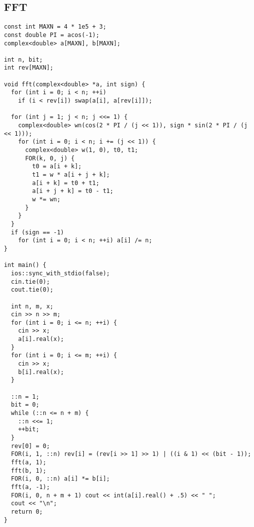 \documentclass[twoside]{article}
\begin{document}
\subsection{FFT}
\begin{lstlisting}
const int MAXN = 4 * 1e5 + 3;
const double PI = acos(-1);
complex<double> a[MAXN], b[MAXN];

int n, bit;
int rev[MAXN];

void fft(complex<double> *a, int sign) {
  for (int i = 0; i < n; ++i)
    if (i < rev[i]) swap(a[i], a[rev[i]]);

  for (int j = 1; j < n; j <<= 1) {
    complex<double> wn(cos(2 * PI / (j << 1)), sign * sin(2 * PI / (j << 1)));
    for (int i = 0; i < n; i += (j << 1)) {
      complex<double> w(1, 0), t0, t1;
      FOR(k, 0, j) {
        t0 = a[i + k];
        t1 = w * a[i + j + k];
        a[i + k] = t0 + t1;
        a[i + j + k] = t0 - t1;
        w *= wn;
      }
    }
  }
  if (sign == -1)
    for (int i = 0; i < n; ++i) a[i] /= n;
}

int main() {
  ios::sync_with_stdio(false);
  cin.tie(0);
  cout.tie(0);

  int n, m, x;
  cin >> n >> m;
  for (int i = 0; i <= n; ++i) {
    cin >> x;
    a[i].real(x);
  }
  for (int i = 0; i <= m; ++i) {
    cin >> x;
    b[i].real(x);
  }

  ::n = 1;
  bit = 0;
  while (::n <= n + m) {
    ::n <<= 1;
    ++bit;
  }
  rev[0] = 0;
  FOR(i, 1, ::n) rev[i] = (rev[i >> 1] >> 1) | ((i & 1) << (bit - 1));
  fft(a, 1);
  fft(b, 1);
  FOR(i, 0, ::n) a[i] *= b[i];
  fft(a, -1);
  FOR(i, 0, n + m + 1) cout << int(a[i].real() + .5) << " ";
  cout << "\n";
  return 0;
}

\end{lstlisting}
\end{document}
